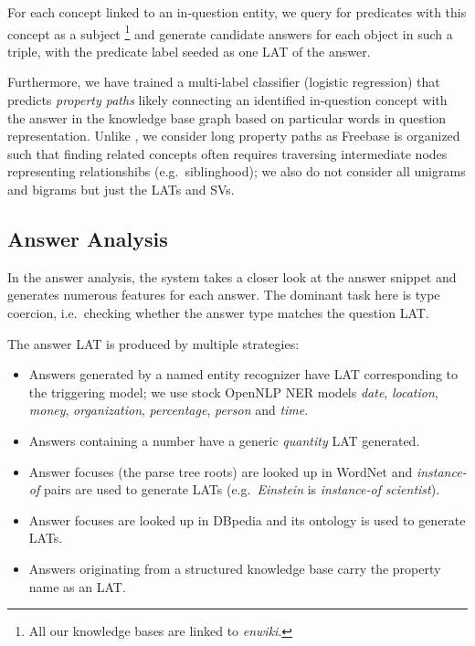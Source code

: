 For each concept
linked to an in-question entity, we query for predicates with this concept as a subject%
\footnote{All our knowledge bases are linked to \textit{enwiki}.}
and generate candidate answers for each object in such a triple, with the predicate label seeded as one LAT of the answer.


Furthermore, we have trained a multi-label classifier (logistic regression)
that predicts \textit{property paths}
likely connecting an identified in-question concept with the answer in the knowledge base
graph based on particular words in question representation. \cite{LeanFreebaseYao}
Unlike \cite{LeanFreebaseYao}, we consider long property paths as
Freebase is organized such that finding related concepts
often requires traversing intermediate nodes representing relationshibs (e.g.\ siblinghood);
we also do not consider all unigrams and bigrams but just the LATs and SVs.

\subsection{Answer Analysis}

In the answer analysis, the system takes a closer look at the answer snippet
and generates numerous features for each answer.
The dominant task here is type coercion,
i.e.\ checking whether the answer type matches the question LAT.

The answer LAT is produced by multiple strategies:
\begin{itemize}
	\item Answers generated by a named entity recognizer have LAT corresponding to the triggering model;
		we use stock OpenNLP NER models \textit{date}, \textit{location}, \textit{money}, \textit{organization}, \textit{percentage}, \textit{person} and \textit{time}.
	\item Answers containing a number have a generic \textit{quantity} LAT generated.
	\item Answer focuses (the parse tree roots) are looked up in WordNet and \textit{instance-of} pairs are used to generate LATs (e.g.\ \textit{Einstein} is \textit{instance-of} \textit{scientist}).
	\item Answer focuses are looked up in DBpedia and its ontology is used to generate LATs.
	\item Answers originating from a structured knowledge base carry the property name as an LAT.
\end{itemize}

